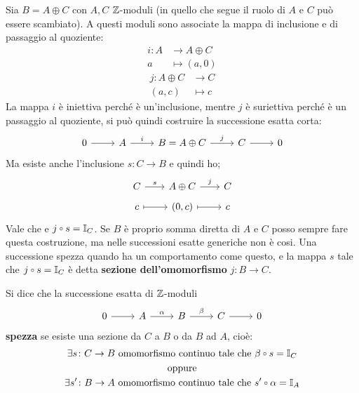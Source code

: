 Sia $ B = A \oplus C $ con $ A, C $ $ \mathbb{Z} $-moduli (in quello che segue il ruolo di
$ A $ e $ C $ può essere scambiato). A questi moduli sono associate la mappa di
inclusione e di passaggio al quoziente:
\begin{align*}
  i \colon A & \to A \oplus C \\
  a & \mapsto (a, 0)
\end{align*}
\begin{align*}
  j \colon A \oplus C & \to C \\
  (a,c) & \mapsto c
\end{align*}
La mappa $ i $ è iniettiva perché è un'inclusione, mentre $ j $ è suriettiva perché
è un passaggio al quoziente, si può quindi costruire la successione esatta corta:
\[
  \begin{tikzcd}
    0 \arrow{r}{} & A \arrow{r}{i} & B = A \oplus C \arrow{r}{j} & C \arrow{r}{} & 0
  \end{tikzcd}
\]
Ma esiste anche l'inclusione $ s \colon C \to B $ e quindi ho;
\[
  \begin{tikzcd}[nodes={row sep=5pt, column sep = 20pt}]
    C \rar{s} & A \oplus C \rar{j} & C \\
    c  \arrow[mapsto]{r}{} & (0,c) \arrow[mapsto]{r}{} & c
  \end{tikzcd}
\]
Vale che e $ j \circ s = \Id{C} $. Se $ B $ è proprio somma diretta di $ A $ e $ C $
posso sempre fare questa costruzione, ma nelle successioni esatte generiche non è cosi.
Una successione spezza quando ha un comportamento come questo, e la mappa $ s $
tale che $ j \circ s = \Id{C} $ è detta \textbf{sezione dell'omomorfismo}
$ j \colon B \to C $.
\begin{definition}[Seconda definizione]
  Si dice che la successione esatta di $ \mathbb{Z} $-moduli
  \[
    \begin{tikzcd}
      0 \arrow{r}{} & A \arrow{r}{\alpha} & B \arrow{r}{\beta} & C \arrow{r}{} & 0
    \end{tikzcd}
  \]
  \textbf{spezza} se esiste una sezione da $ C $ a $ B $
  o da $ B $ ad $ A $, cioè:
  \begin{gather*}
    \exists s \colon C \to B \text{ omomorfismo continuo tale che } \beta \circ s = \Id{C} \\
    \text{oppure} \\
    \exists s' \colon B \to A \text{ omomorfismo continuo tale che } s' \circ \alpha = \Id{A}
  \end{gather*}
\end{definition}
